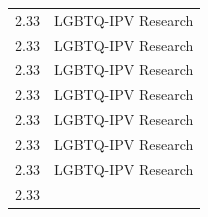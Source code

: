 \documentclass[]{tufte-handout}
\begin{document}
\begin{longtable}[]{@{}ll@{}}
\begin{minipage}[t]{0.09\columnwidth}
2.33\strut
\end{minipage} & \begin{minipage}[t]{0.26\columnwidth}\raggedright\strut
LGBTQ-IPV Research\strut
\end{minipage}\tabularnewline
\begin{minipage}[t]{0.09\columnwidth}\raggedright\strut
2.33\strut
\end{minipage} & \begin{minipage}[t]{0.26\columnwidth}\raggedright\strut
LGBTQ-IPV Research\strut
\end{minipage}\tabularnewline
\begin{minipage}[t]{0.09\columnwidth}\raggedright\strut
2.33\strut
\end{minipage} & \begin{minipage}[t]{0.26\columnwidth}\raggedright\strut
LGBTQ-IPV Research\strut
\end{minipage}\tabularnewline
\begin{minipage}[t]{0.09\columnwidth}\raggedright\strut
2.33\strut
\end{minipage} & \begin{minipage}[t]{0.26\columnwidth}\raggedright\strut
LGBTQ-IPV Research\strut
\end{minipage}\tabularnewline
\begin{minipage}[t]{0.09\columnwidth}\raggedright\strut
2.33\strut
\end{minipage} & \begin{minipage}[t]{0.26\columnwidth}\raggedright\strut
LGBTQ-IPV Research\strut
\end{minipage}\tabularnewline
\begin{minipage}[t]{0.09\columnwidth}\raggedright\strut
2.33\strut
\end{minipage} & \begin{minipage}[t]{0.26\columnwidth}\raggedright\strut
LGBTQ-IPV Research\strut
\end{minipage}\tabularnewline
\begin{minipage}[t]{0.09\columnwidth}\raggedright\strut
2.33\strut
\end{minipage} & \begin{minipage}[t]{0.26\columnwidth}\raggedright\strut
LGBTQ-IPV Research\strut
\end{minipage}\tabularnewline
\begin{minipage}[t]{0.09\columnwidth}\raggedright\strut
2.33\strut
\end{minipage} & \begin{minipage}[t]{0.26\columnwidth}\raggedright\strut

\end{minipage}
\end{longtable}
\end{document}
